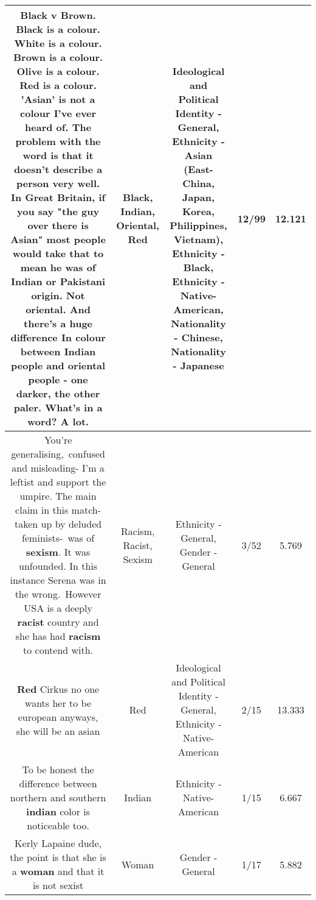 \documentclass[11pt]{article}
\newlength\mylength
\begin{document}
\begin{center}
\begin{longtable}{|C{.65\mylength}|C{.30\mylength}|C{.12\mylength}|C{.12\mylength}|C{.12\mylength}|}
  \small Black v Brown. \textbf{Black} is a colour. White is a colour. Brown is a colour. Olive is a colour. \textbf{R\textbf{ed}} is a colour. 'Asian' is not a colour I've ever heard of. The problem with the word is that it doesn't describe a person very well. In Great Britain, if you say "the guy over there is Asian" most people would  take that to mean he was of \textbf{Indian} or Pakistani origin. Not \textbf{o\textbf{r\textbf{iental}}}. And there's a huge difference In colour between \textbf{Indian} people and \textbf{o\textbf{r\textbf{iental}}} people - one darker, the other paler. What's in a word? A lot.\normalsize   & Black, Indian, Oriental, Red &  Ideological and Political Identity - General, Ethnicity - Asian (East- China, Japan, Korea, Philippines, Vietnam), Ethnicity - Black, Ethnicity - Native-American, Nationality - Chinese, Nationality - Japanese & 12/99 & 12.121 \\  \hline
  \small You're generalising, confused and misleading- I'm a leftist and support the umpire. The main claim in this match- taken up by deluded feminists- was of \textbf{sexism}. It was unfounded. In this instance Serena was in the wrong. However USA is a deeply \textbf{racist} country and she has had \textbf{racism} to contend with.\normalsize   & Racism, Racist, Sexism & Ethnicity - General, Gender - General & 3/52 & 5.769 \\  \hline
  \small \@\textbf{R\textbf{ed}} Cirkus no one wants her to be european anyways, she will be an asian\normalsize   & Red &  Ideological and Political Identity - General, Ethnicity - Native-American & 2/15 & 13.333 \\  \hline
  \small {} To be honest the difference between northern and southern \textbf{indian} color is noticeable too.\normalsize   & Indian & Ethnicity - Native-American & 1/15 & 6.667 \\  \hline
  \small Kerly Lapaine dude, the point is that she is a \textbf{woman} and that it is not sexist\normalsize   & Woman & Gender - General & 1/17 & 5.882 \\  \hline

\end{longtable}
\end{center}
\end{document}
